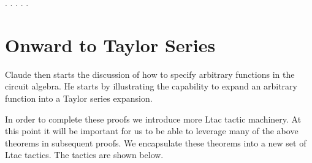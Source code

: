 \documentclass[11pt,twocolumn]{article}
\begin{document}
\begin{coqdoccode}
\coqdocindent{3.00em}
  \coqdoceol
\coqdocindent{3.00em}
  .\coqdoceol
\coqdocnoindent
{}.\coqdoceol
\coqdocindent{1.00em}
   .\coqdoceol
\coqdocindent{1.00em}
   .\coqdoceol
\coqdocnoindent
{}.\coqdoceol
\coqdocemptyline
\end{coqdoccode}
\section{Onward to Taylor Series}




Claude then starts the discussion of how to specify arbitrary
functions in the circuit algebra.  He starts by illustrating the
capability to expand an arbitrary function into a Taylor series
expansion.


In order to complete these proofs we introduce more Ltac tactic
machinery.  At this point it will be important for us to be able to
leverage many of the above theorems in subsequent proofs.  We
encapsulate these theorems into a new set of Ltac tactics.  The
tactics are shown below.
\end{document}
